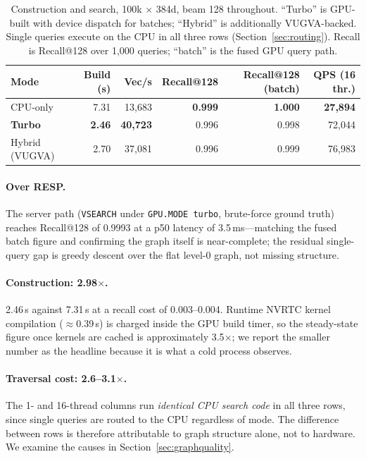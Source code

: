 \documentclass[11pt,twocolumn]{article}
\begin{document}
\begin{table}[ht]
\centering
\caption{Construction and search, 100k $\times$ 384d, beam 128 throughout.
``Turbo'' is GPU-built with device dispatch for batches; ``Hybrid'' is
additionally VUGVA-backed. Single queries execute on the CPU in all three rows
(Section~\ref{sec:routing}). Recall is Recall@128 over 1{,}000 queries;
``batch'' is the fused GPU query path.}
\label{tab:main}
\small
\begin{tabular}{lrrrrr}
\toprule
\textbf{Mode} & \textbf{Build (s)} & \textbf{Vec/s} & \textbf{Recall@128}
 & \textbf{Recall@128 (batch)} & \textbf{QPS (16 thr.)} \\
\midrule
CPU-only          & 7.31 & 13,683 & \textbf{0.999} & \textbf{1.000} & \textbf{27,894} \\
\textbf{Turbo}    & \textbf{2.46} & \textbf{40,723} & 0.996 & 0.998 & 72,044 \\
Hybrid (VUGVA)    & 2.70 & 37,081 & 0.996 & 0.999 & 76,983 \\
\bottomrule
\end{tabular}
\end{table}

\paragraph{Over RESP.} The server path (\texttt{VSEARCH} under
\texttt{GPU.MODE turbo}, brute-force ground truth) reaches Recall@128 of 0.9993
at a p50 latency of 3.5\,ms---matching the fused batch figure and confirming
the graph itself is near-complete; the residual single-query gap is greedy
descent over the flat level-0 graph, not missing structure.

\paragraph{Construction: 2.98$\times$.} 2.46\,s against 7.31\,s at a recall cost
of 0.003--0.004. Runtime NVRTC kernel compilation ($\approx$0.39\,s) is charged
inside the GPU build timer, so the steady-state figure once kernels are cached
is approximately 3.5$\times$; we report the smaller number as the headline
because it is what a cold process observes.

\paragraph{Traversal cost: 2.6--3.1$\times$.} The 1- and 16-thread columns run
\emph{identical CPU search code} in all three rows, since single queries are
routed to the CPU regardless of mode. The difference between rows is therefore
attributable to graph structure alone, not to hardware. We examine the causes in
Section~\ref{sec:graphquality}.
\end{document}

